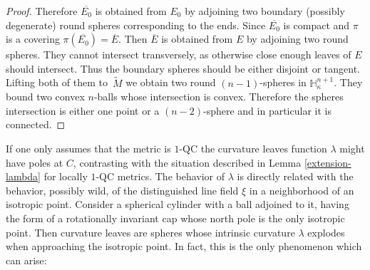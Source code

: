 \documentclass[JEP,XML,SOM,Unicode]{cedram}
\theoremstyle{definition}
\theoremstyle{remark}
\numberwithin{equation}{section}
\begin{document}
\begin{proof}
Therefore $\overline{E_0}$ is obtained from $E_0$ by adjoining two boundary (possibly degenerate)
round spheres corresponding to the ends.
Since $\overline{E_0}$ is compact and $\pi$ is a covering $\pi(\overline{E_0})=\overline{E}$.
Then $\overline{E}$ is obtained from $E$ by adjoining two round spheres.
They cannot intersect transversely, as otherwise close enough leaves of $E$ should intersect.
Thus the boundary spheres should be either disjoint or tangent. Lifting both of them to~$\widetilde{M}$ we obtain two round
$(n-1)$-spheres in $\mathbb H_{\kappa}^{n+1}$. They bound two convex $n$-balls whose intersection is convex.
Therefore the spheres intersection is either one point or a $(n-2)$-sphere and in particular it is connected.
\end{proof}

If one only assumes that the metric is $1$-QC the curvature leaves function $\lambda$ might have poles at $C$, contrasting with
the situation described in Lemma \ref{extension-lambda} for locally $1$-QC metrics.
The behavior of $\lambda$ is directly related with the behavior, possibly wild, of the distinguished line field $\xi$ in a neighborhood of an isotropic point. Consider a spherical
cylinder with a ball adjoined to it, having the form of a
rotationally invariant cap whose north pole is the only isotropic point.
Then curvature leaves are spheres whose intrinsic curvature
$\lambda$ explodes when approaching the isotropic point.
In fact, this is the only phenomenon which can arise:
\end{document}
